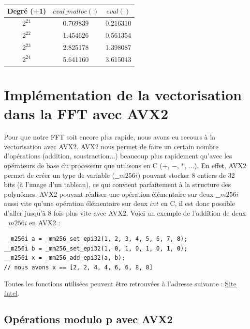 \documentclass[12pt, a4paper]{article}
\begin{document}
\begin{center}
\begin{tabular}{||c c c||}
\hline
Degré (+1) & $eval\_malloc()$ & $eval()$ \\
\hline\hline
$2^{21}$ & 0.769839 & 0.216310 \\
\hline
$2^{22}$ & 1.454626 & 0.561354 \\
\hline
$2^{23}$ & 2.825178 & 1.398087 \\
\hline
$2^{24}$ & 5.641160 & 3.615043 \\
\hline
\end{tabular}
\end{center}
{}

\newpage
\section{Implémentation de la vectorisation dans la FFT avec AVX2}

Pour que notre FFT soit encore plus rapide, nous avons eu recours à la vectorisation avec AVX2. AVX2 nous permet de faire un certain nombre d'opérations (addition, soustraction...) beaucoup plus rapidement qu'avec les opérateurs de base du processeur que utilisons \linebreak en C ($+$, $-$, $*$, ...). En effet, AVX2 permet de créer un type de variable ($\_\_m256i$) pouvant stocker 8 entiers de 32 bits (à l'image d'un tableau), ce qui convient parfaitement à la structure des polynômes. AVX2 pouvant réaliser une opération élémentaire sur deux $\_\_m256i$ aussi vite qu'une opération élémentaire sur deux $int$ en C, il est donc possible d'aller jusqu'à 8 fois plus vite avec AVX2. Voici un exemple de l'addition de deux $\_\_m256i$ en AVX2 : \\
{\begin{lstlisting}
__m256i a = _mm256_set_epi32(1, 2, 3, 4, 5, 6, 7, 8);
__m256i b = _mm256_set_epi32(1, 0, 1, 0, 1, 0, 1, 0);
__m256i x = _mm256_add_epi32(a, b);
// nous avons x == [2, 2, 4, 4, 6, 6, 8, 8]
\end{lstlisting}}

\indent Toutes les fonctions utilisées peuvent être retrouvées à l'adresse suivante : \href{https://www.intel.com/content/www/us/en/docs/intrinsics-guide/index.html#techs=AVX,AVX2}{\underline{\color{blue}Site Intel}}.

\subsection{Opérations modulo p avec AVX2}
\label{operation mod p AVX2}
\end{document}
